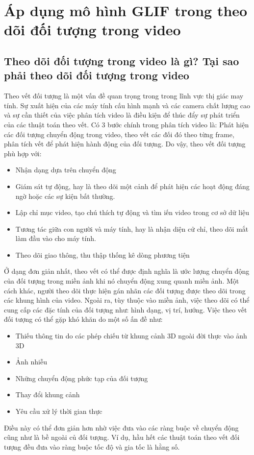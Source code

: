 \documentclass[12pt,oneside,a4]{report}
\begin{document}
\chapter{Áp dụng mô hình GLIF trong theo dõi đối tượng trong video }
\section{Theo dõi đối tượng trong video là gì? Tại sao phải theo dõi đối tượng trong video}
Theo vết đối tượng là một vấn đề quan trọng trong trong lĩnh vực thị giác may tính. Sự xuất hiện của các máy tính cấu hình mạnh và các camera chất lượng cao và sự cần thiết của việc phân tích video  là điều kiện để thúc đẩy sự phát triển của các thuật toán theo vết. Có 3 bước chính trong phân tích video là: Phát hiện các đối tượng chuyển động trong video, theo vết các đối đó theo từng frame, phân tích vết để phát hiện hành động của đối tượng. Do vậy, theo vết đối tượng phù hợp với: 
\begin{itemize}
\item Nhận dạng dựa trên chuyển động
\item Giám sát tự động, hay là theo dõi một cảnh để phát hiện các hoạt động đáng ngờ hoặc các sự kiện bất thường.
\item Lập chỉ mục video, tạo chú thích tự động và tìm iến video trong cơ sở dữ liệu
\item Tương tác giữa con người và máy tính, hay là nhận diện cử chỉ, theo dõi mắt làm đầu vào cho máy tính. 
\item Theo dõi giao thông, thu thập thống kê dòng phương tiện
\end{itemize}
Ở dạng đơn giản nhất, theo vết có thể được định nghĩa là ước lượng chuyển động của đối tượng trong miền ảnh khi nó chuyển động xung quanh miền ảnh. Một cách khác, người theo dõi thực hiện gán nhãn các đối tượng được theo dõi trong các khung hình của video. Ngoài ra, tùy thuộc vào miền ảnh, việc theo dõi có thể cung cấp các đặc tính của đối tượng như: hình dạng, vị trí, hướng. Việc theo vết đối tượng có thể gặp khó khăn do một số ấn đề như: 
\begin{itemize}
\item Thiếu thông tin do các phép chiếu từ khung cảnh 3D ngoài đời thực vào ảnh 3D
\item Ảnh nhiễu
\item Những chuyển động phức tạp của đối tượng
\item Thay đổi khung cảnh
\item Yêu cầu xử lý thời gian thực
\end{itemize} 
Điều này có thể đơn giản hơn nhờ việc đưa vào các ràng buộc về chuyển động cũng như là bề ngoài củ đối tượng. Ví dụ, hầu hết các thuật toán theo vết đối tượng đều đưa vào ràng buộc tốc độ và gia tốc là hằng số. 
\end{document}
